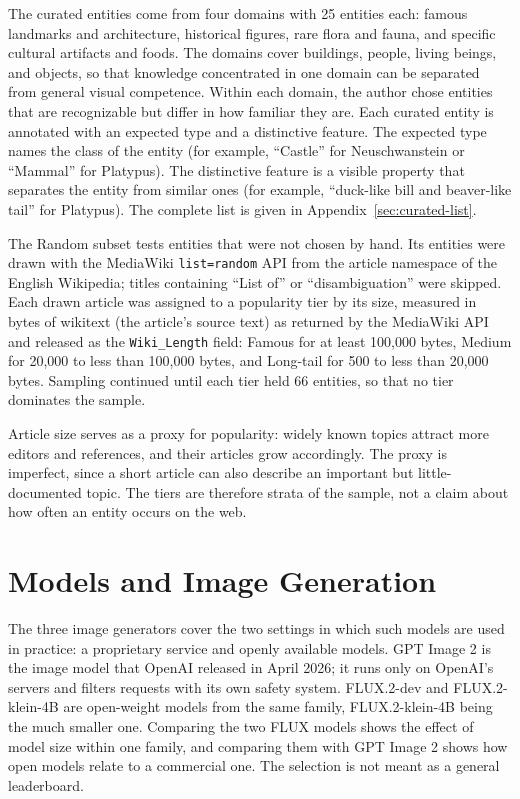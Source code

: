 The curated entities come from four domains with 25 entities each: famous
landmarks and architecture, historical figures, rare flora and fauna, and
specific cultural artifacts and foods. The domains cover buildings, people,
living beings, and objects, so that knowledge concentrated in one domain can be
separated from general visual competence. Within each domain, the author chose
entities that are recognizable but differ in how familiar they are. Each
curated entity is annotated with an expected type and a distinctive feature.
The expected type names the class of the entity (for example, ``Castle'' for
Neuschwanstein or ``Mammal'' for Platypus). The distinctive feature is a
visible property that separates the entity from similar ones (for example,
``duck-like bill and beaver-like tail'' for Platypus). The complete list is given in Appendix~\ref{sec:curated-list}.

The Random subset tests entities that were not chosen by hand. Its entities
were drawn with the MediaWiki \texttt{list=random} API from the article
namespace of the English Wikipedia; titles containing ``List of'' or
``disambiguation'' were skipped. Each drawn article was assigned to a
popularity tier by its size, measured in bytes of wikitext (the article's
source text) as returned by the MediaWiki API and released as the
\texttt{Wiki\_Length} field: Famous for at least 100{,}000 bytes, Medium for
20{,}000 to less than 100{,}000 bytes, and Long-tail for 500 to less than
20{,}000 bytes. Sampling continued until each tier held 66 entities, so that no
tier dominates the sample.

Article size serves as a proxy for popularity: widely known topics attract more
editors and references, and their articles grow accordingly. The proxy is
imperfect, since a short article can also describe an important but
little-documented topic. The tiers are therefore strata of the sample, not a
claim about how often an entity occurs on the web.


\section{Models and Image Generation}
\label{sec:models-and-image-generation}
\label{sec:model-selection}

The three image generators cover the two settings in which such models are used
in practice: a proprietary service and openly available models. GPT Image 2 is
the image model that OpenAI released in April 2026; it runs only on OpenAI's
servers and filters requests with its own safety system. FLUX.2-dev and
FLUX.2-klein-4B are open-weight models from the same family, FLUX.2-klein-4B
being the much smaller one. Comparing the two FLUX models shows the effect of
model size within one family, and comparing them with GPT Image 2 shows how
open models relate to a commercial one. The selection is not meant as a
general leaderboard.


